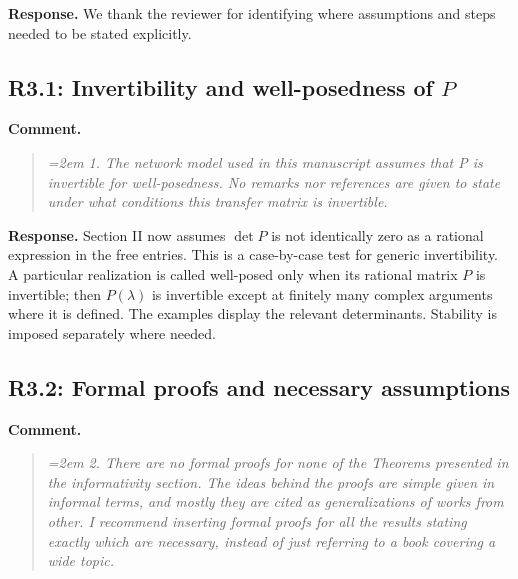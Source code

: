 \documentclass[11pt]{article}
\begin{document}
\textbf{Response.} We thank the reviewer for identifying where assumptions and steps needed to be stated explicitly.

\subsection*{R3.1: Invertibility and well-posedness of $P$}
\textbf{Comment.}
\begin{quote}\itshape\emergencystretch=2em
1. The network model used in this manuscript assumes that P is invertible for well-posedness. No remarks nor references are given to state under what conditions this transfer matrix is invertible.
\end{quote}

\textbf{Response.} Section II now assumes $\det P$ is not identically zero
as a rational expression in the free entries. This is a case-by-case test
for generic invertibility. A particular realization is called well-posed
only when its rational matrix $P$ is invertible; then $P(\lambda)$ is
invertible except at finitely many complex arguments where it is defined.
The examples display the relevant determinants. Stability is imposed
separately where needed.

\subsection*{R3.2: Formal proofs and necessary assumptions}
\textbf{Comment.}
\begin{quote}\itshape\emergencystretch=2em
2. There are no formal proofs for none of the Theorems presented in the informativity section. The ideas behind the proofs are simple given in informal terms, and mostly they are cited as generalizations of works from other. I recommend inserting formal proofs for all the results stating exactly which are necessary, instead of just referring to a book covering a wide topic.
\end{quote}
\end{document}
